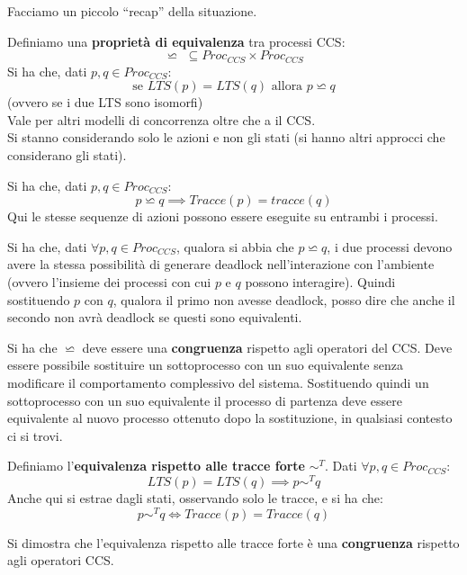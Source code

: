 \documentclass[a4paper,12pt, oneside]{book}
\begin{document}
Facciamo un piccolo ``recap'' della situazione.
\begin{definizione}
  Definiamo una \textbf{proprietà di equivalenza} tra processi CCS:
  \[\backsimeq \,\,\subseteq  Proc_{CCS}\times  Proc_{CCS}\]
  Si ha che, dati $p,q\in Proc_{CCS}$:
  \[\mbox{se }LTS(p)=LTS(q)\mbox{ allora } p\backsimeq q\]
  (ovvero se i due LTS sono isomorfi)\\
  Vale per altri modelli di concorrenza oltre che a il CCS.\\
  Si stanno considerando solo le azioni e non gli stati (si hanno altri approcci
  che considerano gli stati).
\end{definizione}
\begin{teorema}
  Si ha che, dati $p,q\in Proc_{CCS}$:
  \[p\backsimeq q\implies Tracce(p)=tracce(q)\]
  Qui le stesse sequenze di azioni possono essere eseguite su entrambi i
  processi.  
\end{teorema}
\begin{teorema}
  Si ha che, dati $\forall p,q\in Proc_{CCS}$, qualora si abbia che $p\backsimeq
  q$, i due processi devono avere la stessa possibilità di generare deadlock
  nell'interazione con l'ambiente (ovvero l'insieme dei processi con cui $p$ e
  $q$ possono interagire). Quindi sostituendo $p$ con $q$, qualora il
  primo non avesse deadlock, posso dire che anche il secondo non avrà deadlock
  se questi sono equivalenti.
\end{teorema}
\begin{teorema}
  Si ha che $\backsimeq$ deve essere una \textbf{congruenza} rispetto agli
  operatori del CCS. Deve essere possibile sostituire un sottoprocesso con un
  suo equivalente senza modificare il comportamento complessivo del
  sistema. Sostituendo quindi un sottoprocesso con un suo equivalente il
  processo di partenza deve essere equivalente al nuovo processo ottenuto dopo
  la sostituzione, in qualsiasi contesto ci si trovi.
\end{teorema}
\begin{definizione}
  Definiamo l'\textbf{equivalenza rispetto alle tracce forte} $\sim^T$. Dati
  $\forall p,q\in Proc_{CCS}$:
  \[LTS(p)=LTS(q)\implies p\sim^T q\]
  Anche qui si estrae dagli stati, osservando solo le tracce, e si ha che:
  \[p\sim^T q\iff Tracce(p)=Tracce(q)\]
\end{definizione}
\begin{teorema}
  Si dimostra che l'equivalenza rispetto alle tracce forte è una
  \textbf{congruenza} rispetto agli operatori CCS.
\end{teorema}
\end{document}
